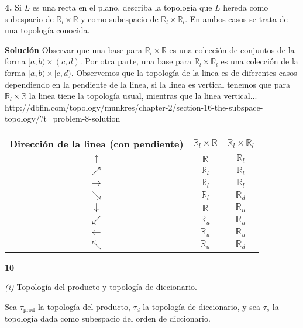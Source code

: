 \documentclass[notitlepage]{article}
\newcommand{\RR}{\mathbb{R}}
\newcommand{\qt}[1]{\textrm{#1}}
\begin{document}
\textbf{4.} Si $L$ es una recta en el plano, describa la topología que $L$ hereda como subespacio de $\RR_l \times \RR$ y como subespacio de $\RR_l \times \RR_l $. En ambos casos se trata de una topología conocida.

\textbf{Solución}
Observar que una base para $\RR_l \times \RR$ es una colección de conjuntos de la forma $[a,b) \times (c,d)$. Por otra parte, una base para $\RR_l \times \RR_l$ es una colección de la forma $[a,b) \times [c,d)$. Observemos que la topología de la linea es de diferentes casos dependiendo en la pendiente de la linea, si la linea es vertical tenemos que para $\RR_l \times \RR$ la linea tiene la topología usual, mientras que la linea vertical... http://dbfin.com/topology/munkres/chapter-2/section-16-the-subspace-topology/?t=problem-8-solution



\begin{tabular}{|c|c|c|}
	\hline Dirección de la linea (con pendiente)  & $\RR_l \times \RR$   & $\RR_l \times \RR_l$  \\ 
	\hline $\uparrow$ & $\RR$  & $\RR_l$  \\ 
	\hline $\nearrow$ & $\RR_l$ & $\RR_l$ \\ 
	\hline $\rightarrow $ & $\RR_l$ & $\RR_l$  \\ 
	\hline $\searrow $ & $\RR_l$ & $\RR_d$  \\ 
	\hline $\downarrow $ & $\RR$ & $\RR_u$  \\ 
	\hline $\swarrow $ & $\RR_u$ & $\RR_u$  \\ 
	\hline $ \leftarrow $ & $\RR_u$ & $\RR_u$ \\ 
	\hline $\nwarrow $ & $\RR_u$ & $\RR_d$ \\ 
	\hline 
\end{tabular} 


\textbf{10}

\emph{(i)} Topología del producto y topología de diccionario.

Sea $ \tau_{\qt{prod}} $ la topología del producto, $\tau_{d} $ la topología de diccionario, y sea $ \tau_s$ la topología dada como subespacio del orden de diccionario. 
\end{document}
